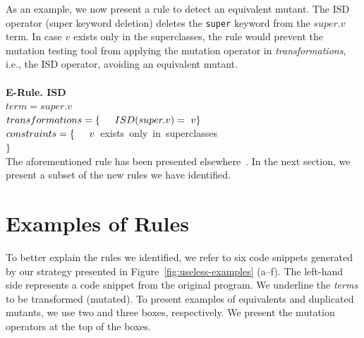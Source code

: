 As an example, we now present a rule to detect an equivalent mutant. The ISD operator (super keyword deletion) deletes the \texttt{super} keyword from the $super.v$ term. In case $v$ exists only in the superclasses, the rule would prevent the mutation testing tool from applying the mutation operator in \textit{transformations}, i.e., the ISD operator, avoiding an equivalent mutant.
\\
\\
\textbf{E-Rule. ISD}\\
$term = super.v$\\
$transformations = \{\\ \indent ISD(super.v) =~v \\\}$\\
$constraints = \{ \\ \indent v$~exists~only~in~superclasses \\ $\}$\\

The aforementioned rule has been presented elsewhere~\cite{OFFUT:2006:1}. In the next section, we present a subset of the new rules we have identified.

\section{Examples of Rules}
\label{sec:examples-of-rules}

To better explain the rules we identified, we refer to six code snippets generated by our strategy presented in Figure~\ref{fig:useless-examples} (a--f). 
The left-hand side represents a code snippet from the original program. 
We underline the \textit{terms} to be transformed (mutated). 
To present examples of equivalents and duplicated mutants, we use two and three boxes, respectively. 
We present the mutation operators at the top of the boxes.


